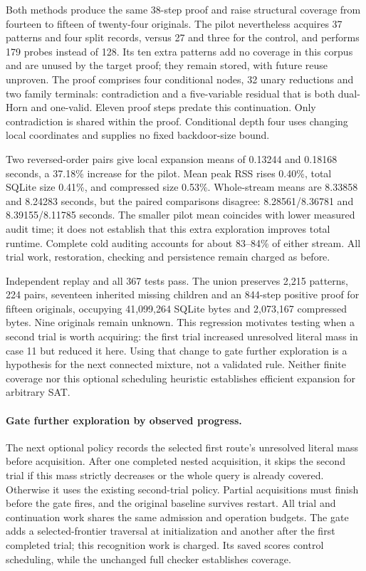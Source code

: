 \documentclass[11pt,a4paper]{article}
\numberwithin{equation}{section}
\theoremstyle{plain}
\theoremstyle{definition}
\theoremstyle{remark}
\begin{document}
Both methods produce the same 38-step proof and raise structural coverage from
fourteen to fifteen of twenty-four originals. The pilot nevertheless acquires
37 patterns and four split records, versus 27 and three for the control, and
performs 179 probes instead of 128. Its ten extra patterns add no coverage in
this corpus and are unused by the target proof; they remain stored, with future
reuse unproven. The proof comprises four conditional nodes, 32 unary reductions
and two family terminals: contradiction and a five-variable residual that is
both dual-Horn and one-valid. Eleven proof steps predate this continuation.
Only contradiction is shared within the proof. Conditional depth four uses
changing local coordinates and supplies no fixed backdoor-size bound.

Two reversed-order pairs give local expansion means of 0.13244 and 0.18168
seconds, a 37.18\% increase for the pilot. Mean peak RSS rises 0.40\%, total
SQLite size 0.41\%, and compressed size 0.53\%. Whole-stream means are 8.33858
and 8.24283 seconds, but the paired comparisons disagree: 8.28561/8.36781 and
8.39155/8.11785 seconds. The smaller pilot mean coincides with lower measured
audit time; it does not establish that this extra exploration improves total
runtime. Complete cold auditing accounts for about 83--84\% of either stream.
All trial work, restoration, checking and persistence remain charged as before.

Independent replay and all 367 tests pass. The union preserves 2,215 patterns,
224 pairs, seventeen inherited missing children and an 844-step positive proof
for fifteen originals, occupying 41,099,264 SQLite bytes and 2,073,167 compressed
bytes. Nine originals remain unknown. This regression motivates testing when a
second trial is worth acquiring: the first trial increased unresolved literal
mass in case 11 but reduced it here. Using that change to gate further exploration
is a hypothesis for the next connected mixture, not a validated rule. Neither
finite coverage nor this optional scheduling heuristic establishes efficient
expansion for arbitrary SAT.

\paragraph{Gate further exploration by observed progress.}
The next optional policy records the selected first route's unresolved literal
mass before acquisition. After one completed nested acquisition, it skips the
second trial if this mass strictly decreases or the whole query is already
covered. Otherwise it uses the existing second-trial policy. Partial acquisitions
must finish before the gate fires, and the original baseline survives restart.
All trial and continuation work shares the same admission and operation budgets.
The gate adds a selected-frontier traversal at initialization and another after
the first completed trial; this recognition work is charged. Its saved scores
control scheduling, while the unchanged full checker establishes coverage.
\end{document}
